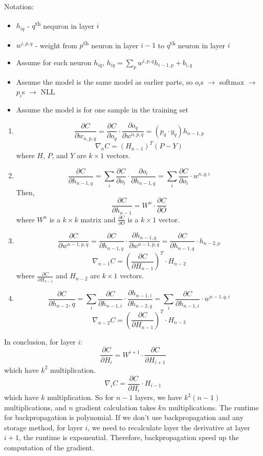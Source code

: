\documentclass[11pt,twoside]{article}
\begin{document}
Notation:
\begin{itemize}
\item $h_{iq}$ - $q$\textsuperscript{th} nequron in layer $i$
\item $w^{i,p,q}$ - weight from $p$\textsuperscript{th} neuron in layer $i-1$ to $q$\textsuperscript{th} neuron in layer $i$
\item Assume for each neuron $h_{iq}$, $h_{iq} = \sum_p w^{i, p, q}h_{i-1, p}+b_{i, q}$
\item Assume the model is the same model as earlier parts, so $o_i$s $\rightarrow$ softmax $\rightarrow$ $p_i$s $\rightarrow$ NLL
\item Assume the model is for one sample in the training set
\end{itemize}
\begin{enumerate}
\item 
\[\frac{\partial C}{\partial w_{n, p, q}} = \frac{\partial C}{\partial o_q} \cdot \frac{\partial o_q}{\partial w^{n, p, q}} = (p_q \cdot y_q)h_{n-1, p}\]
\[\nabla_nC = (H_{n-1})^T(P-Y)\]
where $H$, $P$, and $Y$ are $k \times 1$ vectors.
\item 
\[\frac{\partial C}{\partial h_{n-1, q}} = \sum_i \frac{\partial C}{\partial o_i} \cdot \frac{\partial o_i}{\partial h_{n-1, q}} = \sum_i \frac{\partial C}{\partial o_i} \cdot w^{n, q, i}\]
Then, 
\[\frac{\partial C}{\partial h_{n-1}} = W^n \cdot \frac{\partial C}{\partial O}\]
where $W^n$ is a $k \times k$ matrix and $\frac{\partial C}{\partial O}$ is a $k \times 1$ vector.
\item \[\frac{\partial C}{\partial w^{n-1, p, q}} = \frac{\partial C}{\partial h_{n-1, q}} \cdot \frac{\partial h_{n-1, q}}{\partial w^{n-1, p, q}} = \frac{\partial C}{\partial h_{n-1, q}} \cdot h_{n-2, p}\]
\[\nabla_{n-1}C = (\frac{\partial C}{\partial H_{n-1}})^T \cdot H_{n-2}\]
where $\frac{\partial C}{\partial H_{n-1}}$ and $H_{n-2}$ are $k \times 1$ vectors.
\item \[\frac{\partial C}{\partial h_{n-2}, q} = \sum_i \frac{\partial C}{\partial h_{n-1, i}} \cdot \frac{\partial h_{n-1, i}}{\partial h_{n-2, q}} = \sum_i \frac{\partial C}{\partial h_{n-1, i}} \cdot w^{n-1, q, i}\]
\[\nabla_{n-2} C = (\frac{\partial C}{\partial H_{n-1}})^T \cdot H_{n-3}\]
\end{enumerate}
In conclusion, for layer $i$:
\[\frac{\partial C}{\partial H_i} =  W^{i+1} \cdot \frac{\partial C}{\partial H_{i+1}}\]
which have $k^2$ multiplication.
\[\nabla_i C = \frac{\partial C}{\partial H_i} \cdot H_{i-1}\]
which have $k$ multiplication.
So for $n-1$ layers, we have $k^2(n-1)$ multiplications, and $n$ gradient calculation takes $kn$ multiplications. The runtime for backpropagation is polynomial. If we don't use backpropagation and any storage method, for layer $i$, we need to recalculate layer the derivative at layer $i+1$, the runtime is exponential. Therefore, backpropagation speed up the computation of the gradient.
\end{document}
